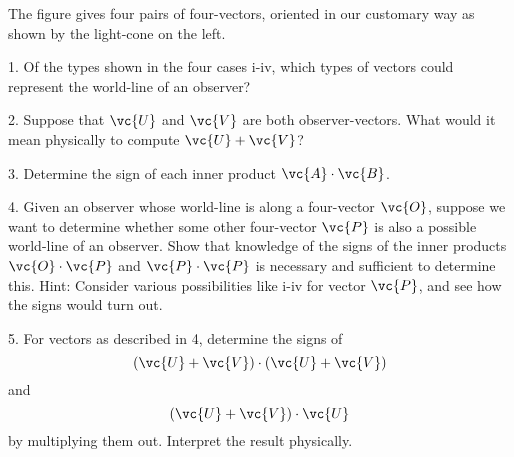 The figure gives four pairs of four-vectors, oriented in our customary way as
shown by the light-cone on the left.


1. Of the types shown in the four cases i-iv, which types of vectors could represent the
world-line of an observer?

2. Suppose that $\vc{U}$ and $\vc{V}$ are both observer-vectors. What would it mean
physically to compute $\vc{U}+\vc{V}$?

3. Determine the sign of each inner product $\vc{A}\cdot\vc{B}$.

4. Given an observer whose world-line is along a four-vector $\vc{O}$,
suppose we want to determine whether some other four-vector $\vc{P}$
is also a possible world-line of an observer. Show that knowledge of
the signs of the inner products $\vc{O}\cdot\vc{P}$ and
$\vc{P}\cdot\vc{P}$  is necessary and sufficient to determine this.
Hint: Consider various possibilities like i-iv for vector $\vc{P}$,
and see how the signs would turn out.

5. For vectors as described in 4, determine the signs of
\begin{equation*}
  (\vc{U}+\vc{V})\cdot(\vc{U}+\vc{V})
\end{equation*}
and
\begin{equation*}
  (\vc{U}+\vc{V})\cdot\vc{U}
\end{equation*}
by multiplying them out. Interpret the result physically.
